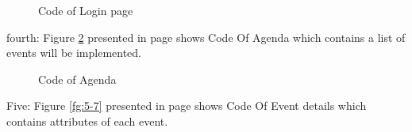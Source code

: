 \documentclass[12pt,a4paper,class,twoside,openany]{report}
\begin{document}
{\begin{figure}
\begin{center}
{}
\caption{Code of Login page}
\label{fg:5-5}
\end{center}
\end{figure}
fourth:
Figure \ref{fg:5-6} presented in page \pageref{fg:5-6}shows Code Of Agenda which contains a list of events will be implemented.
\begin{figure}
\begin{center}
\caption{Code of Agenda}
\label{fg:5-6}
\end{center}
\end{figure}
Five:
Figure \ref{fg:5-7} presented in page \pageref{fg:5-7}shows Code Of Event details which contains attributes of each event.
}
\end{document}
